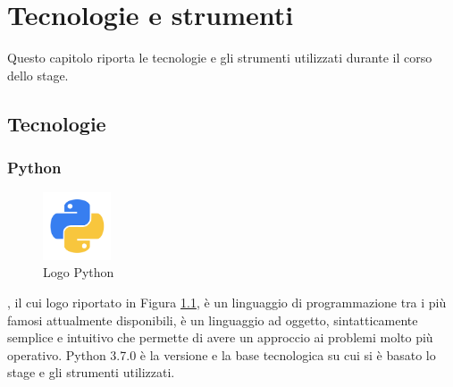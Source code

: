 
\hypertarget{(chap:capitolo6)}{}
\chapter{Tecnologie e strumenti}
Questo capitolo riporta le tecnologie e gli strumenti utilizzati durante il corso dello stage.
\section{Tecnologie}
\subsection{Python}
\begin{figure}[H]
	\begin{center} \includegraphics[width=2cm]{figures/python}
		\caption[Logo Python]{Logo Python} 
		\label{logo_python} 
	\end{center}
\end{figure}
, il cui logo riportato in Figura \ref{logo_python}, è un linguaggio di programmazione tra i più famosi attualmente disponibili, è un linguaggio ad oggetto, sintatticamente semplice e intuitivo che permette di avere un approccio ai problemi molto più operativo. Python 3.7.0 è la versione e la base tecnologica su cui si è basato lo stage e gli strumenti utilizzati.

